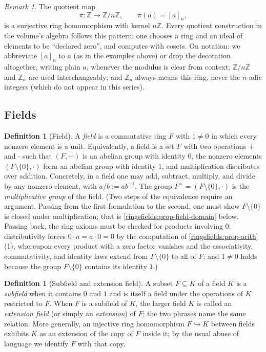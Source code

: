 \documentclass[11pt,a4paper]{article}
\theoremstyle{definition}
\newtheorem{definition}[theorem]{Definition}
\theoremstyle{remark}
\newtheorem{remark}[theorem]{Remark}
\newcommand{\Z}{\ensuremath{\mathbb{Z}}}
\begin{document}
\begin{remark}\label{ringsfields:rem-quotientring}
The quotient map
\[
\pi\colon\Z\to\Z/n\Z, \qquad \pi(a)=[a]_n,
\]
is a surjective ring homomorphism with kernel \(n\Z\). Every quotient
construction in the volume's algebra follows this pattern: one chooses a
ring and an ideal of elements to be ``declared zero'', and computes with
cosets. On notation: we abbreviate \([a]_n\)
to \(\overline{a}\) (as in the examples above) or drop the decoration
altogether, writing plain \(a\), whenever the modulus is clear from
context; \(\Z/n\Z\) and \(\Z_n\) are used interchangeably; and \(\Z_n\)
always means this ring, never the \(n\)-adic integers (which do not appear
in this series).
\end{remark}

\subsection{Fields}\label{ringsfields:subsec-fields}

\begin{definition}[Field]\label{ringsfields:def-field}
A \emph{field} is a commutative ring \(F\) with \(1\neq 0\) in which every
nonzero element is a unit. Equivalently, a field is a set \(F\) with two
operations \(+\) and \(\cdot\) such that \((F,+)\) is an abelian group with
identity \(0\), the nonzero elements \((F\setminus\{0\},\cdot)\) form an
abelian group with identity \(1\), and multiplication distributes over
addition. Concretely, in a field one may add, subtract, multiply, and
divide by any nonzero element, with \(a/b:=ab^{-1}\). The
group \(F^\times=(F\setminus\{0\},\cdot)\) is the \emph{multiplicative
group} of the field. (Two steps of the equivalence require an argument.
Passing from the first formulation to the second, one
must show \(F\setminus\{0\}\) is closed under multiplication; that is
\cref{ringsfields:prop-field-domain} below. Passing back, the ring
axioms must be checked for products involving \(0\): distributivity
forces \(0\cdot a=a\cdot 0=0\) by the computation of
\cref{ringsfields:prop-arith}(1), whereupon every product with a zero
factor vanishes and the associativity, commutativity, and identity
laws extend from \(F\setminus\{0\}\) to all of \(F\); and \(1\neq 0\)
holds because the group \(F\setminus\{0\}\) contains its identity
\(1\).)
\end{definition}

\begin{definition}[Subfield and extension field]\label{ringsfields:def-extension}
A subset \(F \subseteq K\) of a field \(K\) is a \emph{subfield} when it
contains \(0\) and \(1\) and is itself a field under the operations of
\(K\) restricted to \(F\). When \(F\) is a subfield of \(K\), the larger
field \(K\) is called an \emph{extension field} (or simply an
\emph{extension}) of \(F\); the two phrases name the same relation.
More generally, an injective ring homomorphism
\(F \hookrightarrow K\) between fields exhibits \(K\) as an extension of
the copy of \(F\) inside it; by the usual abuse of language we identify
\(F\) with that copy.
\end{definition}
\end{document}
